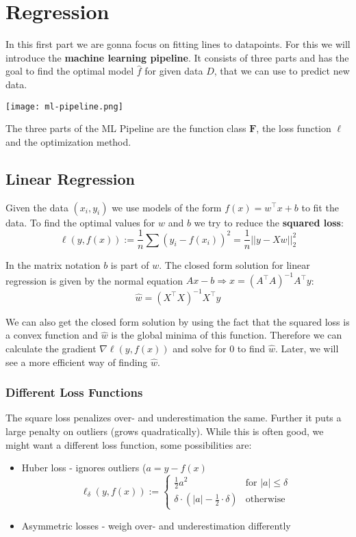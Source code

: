 \section{Regression}

In this first part we are gonna focus on fitting lines to datapoints. For this we will introduce the \textbf{machine learning pipeline}. It consists of three parts and has the goal to find the optimal model $\hat{f}$ for given data $D$, that we can use to predict new data.

\smallskip
\texttt{[image: ml-pipeline.png]}

The three parts of the ML Pipeline are the function class $\mathbf{F}$, the loss function $\ell$ and the optimization method.

\subsection{Linear Regression}

Given the data $(x_i, y_i)$ we use models of the form $f(x) = w^\top x + b$ to fit the data. To find the optimal values for $w$ and $b$ we try to reduce the \textbf{squared loss}:
$$\ell(y, f(x)) := \frac{1}{n}\sum (y_i - f(x_i))^2 = \frac{1}{n}||y - X w||_2^2$$

In the matrix notation $b$ is part of $w$. The closed form solution for linear regression is given by the normal equation $Ax - b \Rightarrow x = (A^\top A)^{-1} A^\top y$:
$$\hat{w} = (X^\top X)^{-1}X^\top y$$

We can also get the closed form solution by using the fact that the squared loss is a convex function and $\hat{w}$ is the global minima of this function. Therefore we can calculate the gradient $\nabla \ell(y, f(x))$ and solve for $0$ to find $\hat{w}$. Later, we will see a more efficient way of finding $\hat{w}$. \medskip

\subsubsection{Different Loss Functions}

The square loss penalizes over- and underestimation the same. Further it puts a large penalty on outliers (grows quadratically). While this is often good, we might want a different loss function, some possibilities are:

\begin{itemize}
	\item Huber loss - ignores outliers ($a = y - f(x)$
		$$\ell_\delta(y, f(x)) := \begin{cases}
			\frac{1}{2} a^2 & \text{for } |a| \leq \delta \\
			\delta \cdot (|a| - \frac{1}{2} \cdot \delta) & \text{otherwise}
		\end{cases}$$
	\item Asymmetric losses - weigh over- and underestimation differently
\end{itemize}

